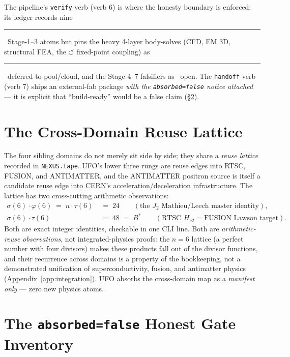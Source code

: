 \documentclass[11pt,a4paper]{article}
\newcommand{\tierdisc}[1]{\textcolor{#1}{\rule[0.05ex]{1.0ex}{1.0ex}}}
\newcommand{\tierdiscopen}{\textcolor{gray!60!black}{\scalebox{0.6}{$\bigcirc$}}}
\newcommand{\tierGreen}{\tierdisc{green!60!black}}
\newcommand{\tierOrange}{\tierdisc{orange!90!black}}
\newcommand{\tierWhite}{\tierdiscopen}
\begin{document}
The pipeline's \texttt{verify} verb (verb 6) is where the honesty
boundary is enforced: its ledger records nine \tierGreen\ Stage-1--3
atoms but pins the heavy 4-layer body-solves (CFD, EM 3D, structural
FEA, the $\circlearrowleft$ fixed-point coupling) as \tierOrange\
deferred-to-pool/cloud, and the Stage-4--7 falsifiers as \tierWhite\
open. The \texttt{handoff} verb (verb 7) ships an external-fab package
\emph{with the \texttt{absorbed=false} notice attached} --- it is
explicit that ``build-ready'' would be a false claim
(\S\ref{sec:absorbed}).

\section{The Cross-Domain Reuse Lattice}
\label{sec:lattice}

The four sibling domains do not merely sit side by side; they share a
\emph{reuse lattice} recorded in \texttt{NEXUS.tape}. UFO's lower three
rungs are reuse edges into RTSC, FUSION, and ANTIMATTER, and the
ANTIMATTER positron source is itself a candidate reuse edge into CERN's
acceleration/deceleration infrastructure. The lattice has two cross-cutting
arithmetic observations:
\begin{align}
\sigma(6)\!\cdot\!\varphi(6) \;=\; n\!\cdot\!\tau(6) \;&=\; 24
  \qquad(\text{the } J_2 \text{ Mathieu/Leech master identity}), \\
\sigma(6)\!\cdot\!\tau(6) \;&=\; 48 \;=\; B^{*}
  \qquad(\text{RTSC } H_{c2} = \text{FUSION Lawson target}).
\end{align}
Both are exact integer identities, checkable in one CLI line. Both are
\emph{arithmetic-reuse observations}, not integrated-physics proofs: the
$n\!=\!6$ lattice (a perfect number with four divisors) makes these
products fall out of the divisor functions, and their recurrence across
domains is a property of the bookkeeping, not a demonstrated unification
of superconductivity, fusion, and antimatter physics
(Appendix~\ref{app:integration}). UFO absorbs the cross-domain map as a
\emph{manifest only} --- zero new physics atoms.

\section{The \texttt{absorbed=false} Honest Gate Inventory}
\label{sec:absorbed}
\end{document}
